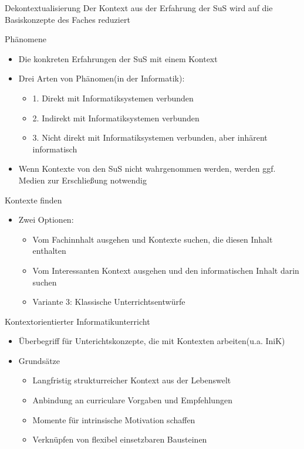 \documentclass{article}
\begin{document}
\begin{block}{Dekontextualisierung}
    Der Kontext aus der Erfahrung der SuS wird auf die Basiskonzepte des Faches reduziert
\end{block}

\begin{block}{Phänomene}
    \begin{itemize}
        \item Die konkreten Erfahrungen der SuS mit einem Kontext
        \item Drei Arten von Phänomen(in der Informatik):
        \begin{itemize}
            \item 1. Direkt mit Informatiksystemen verbunden
            \item 2. Indirekt mit Informatiksystemen verbunden
            \item 3. Nicht direkt mit Informatiksystemen verbunden, aber inhärent informatisch
        \end{itemize}
        \item Wenn Kontexte von den SuS nicht wahrgenommen werden, werden ggf. Medien zur Erschließung notwendig
    \end{itemize}
\end{block}

\begin{block}{Kontexte finden}
    \begin{itemize}
        \item Zwei Optionen:
        \begin{itemize}
            \item Vom Fachinnhalt ausgehen und Kontexte suchen, die diesen Inhalt enthalten
            \item Vom Interessanten Kontext ausgehen und den informatischen Inhalt darin suchen
            \item Variante 3: Klassische Unterrichtsentwürfe
        \end{itemize}
    \end{itemize}
\end{block}

\begin{block}{Kontextorientierter Informatikunterricht}
    \begin{itemize}
        \item Überbegriff für Unterichtskonzepte, die mit Kontexten arbeiten(u.a. IniK)
        \item Grundsätze
        \begin{itemize}
            \item Langfristig strukturreicher Kontext aus der Lebenswelt
            \item Anbindung an curriculare Vorgaben und Empfehlungen
            \item Momente für intrinsische Motivation schaffen
            \item Verknüpfen von flexibel einsetzbaren Bausteinen
        \end{itemize}
    \end{itemize}
\end{block}
\end{document}
